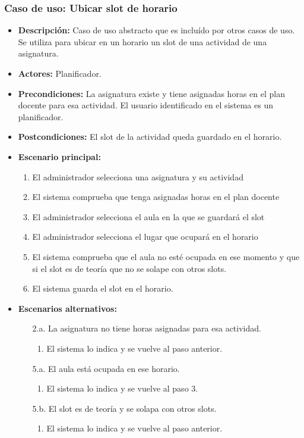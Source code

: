 \subsubsection*{Caso de uso: Ubicar slot de horario}
\label{guardar_slot}
\begin{itemize}
\item{\bf Descripción:} Caso de uso abstracto que es incluído por otros casos de uso. Se utiliza para ubicar en un horario un slot de una actividad de una asignatura.
\item{\bf Actores:} Planificador.
\item{\bf Precondiciones:} La asignatura existe y tiene asignadas horas en el plan docente para esa actividad. El usuario identificado en el sistema es un planificador.
\item{\bf Postcondiciones:} El slot de la actividad queda guardado en el horario.
\item{\bf Escenario principal:}
	\begin{enumerate}
	\item El administrador selecciona una asignatura y su actividad
	\item El sistema comprueba que tenga asignadas horas en el plan docente
	\item El administrador selecciona el aula en la que se guardará el slot
	\item El administrador selecciona el lugar que ocupará en el horario
	\item El sistema comprueba que el aula no esté ocupada en ese momento y que si el slot es de teoría que no se solape con otros slots.
	\item El sistema guarda el slot en el horario.
	\end{enumerate}
\item{\bf Escenarios alternativos:}
	\begin{itemize}
		\item[2.a.] La asignatura no tiene horas asignadas para esa actividad.
		\begin{enumerate}
			\item El sistema lo indica y se vuelve al paso anterior.
		\end{enumerate}
		\item[5.a.] El aula está ocupada en ese horario.
		\begin{enumerate}
			\item El sistema lo indica y se vuelve al paso 3.
		\end{enumerate}
		\item[5.b.] El slot es de teoría y se solapa con otros slots.
		\begin{enumerate}
			\item El sistema lo indica y se vuelve al paso anterior.
		\end{enumerate}
	\end{itemize}
\end{itemize}



